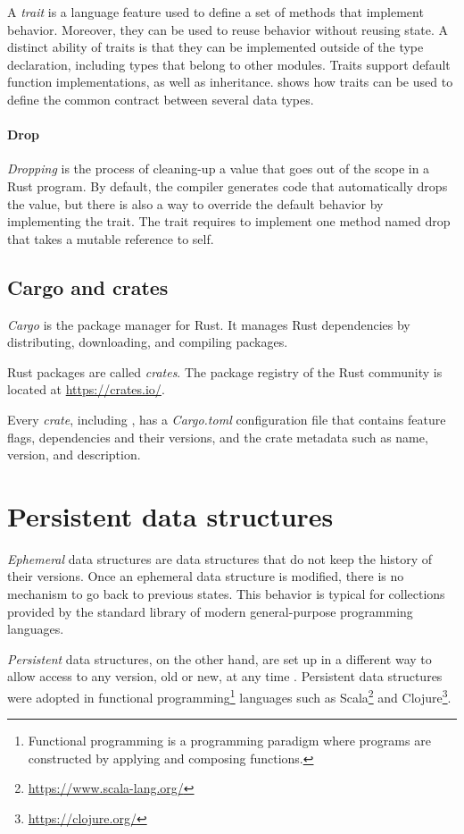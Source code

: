 A \emph{trait} is a language feature used to define a set of methods that implement behavior. Moreover, they can be used to reuse behavior without reusing state\cite{schaerli-ducasse-nierstrasz-traits}. A distinct ability of traits is that they can be implemented outside of the type declaration, including types that belong to other modules. Traits support default function implementations, as well as inheritance.  shows how traits can be used to define the common contract between several data types.

\paragraph{Drop}
\emph{Dropping} is the process of cleaning-up a value that goes out of the scope in a Rust program. By default, the compiler generates code that automatically drops the value, but there is also a way to override the default behavior by implementing the  trait. The  trait requires to implement one method named drop that takes a mutable reference to self.

\subsection{Cargo and crates}
\emph{Cargo} is the package manager for Rust. It manages Rust dependencies by distributing, downloading, and compiling packages.

Rust packages are called \emph{crates}. The package registry of the Rust community is located at \url{https://crates.io/}.

Every \emph{crate}, including \pvecrs{}, has a \emph{Cargo.toml} configuration file that contains feature flags, dependencies and their versions, and the crate metadata such as name, version, and description.

\section{Persistent data structures}
\label{sec:psds}

\emph{Ephemeral} data structures are data structures that do not keep the history of their versions. Once an ephemeral data structure is modified, there is no mechanism to go back to previous states. This behavior is typical for collections provided by the standard library of modern general-purpose programming languages.

\emph{Persistent} data structures, on the other hand, are set up in a different way to allow access to any version, old or new, at any time \cite{making-data-structures-persistent}. Persistent data structures were adopted in functional programming\footnote{Functional programming is a programming paradigm where programs are constructed by applying and composing functions.} languages such as Scala\footnote{\url{https://www.scala-lang.org/}} and Clojure\footnote{\url{https://clojure.org/}}.

